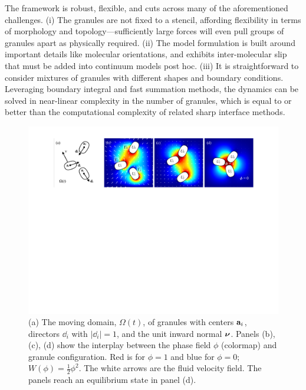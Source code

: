 The framework is robust, flexible, and cuts across many of the
aforementioned challenges. (i) The granules are not fixed to a stencil,
affording flexibility in terms of morphology and topology---sufficiently
large forces will even pull groups of granules apart as physically
required. (ii) The model formulation is built around important details
like molecular orientations, and exhibits inter-molecular slip that must
be added into continuum models post hoc. (iii) It is
straightforward to consider mixtures of granules with different shapes
and boundary conditions. Leveraging boundary integral and fast summation
methods, the dynamics can be solved in near-linear complexity in the
number of granules, which is equal to or better than the computational
complexity of related sharp interface methods. 

\begin{figure}
  \begin{center}
    \includegraphics[width=\textwidth]{figures/Background/Domain.pdf}
  \end{center}
  \caption{\label{fig:flow_map} \footnotesize (a) The moving domain,
  $\Omega(t)$, of granules with centers $\aa_i$, directors $\dd_i$ with
  $|\dd_i| = 1$, and the unit inward normal $\nnu$. Panels (b), (c), (d)
  show the interplay between the phase field $\phi$ (colormap) and
  granule configuration. Red is for $\phi = 1$ and blue for $\phi = 0$;
  $W(\phi) = \tfrac{1}{2}\phi^2$. The white arrows are the fluid
  velocity field. The panels reach an equilibrium state in panel (d).}
\end{figure}


